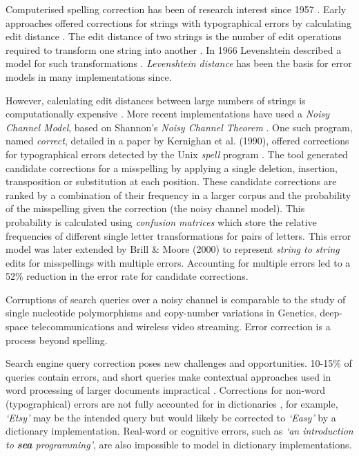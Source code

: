 \documentclass{csfourzero}
\begin{document}
Computerised spelling correction has been of research interest since 1957 \cite{jameslpeterson1980beginning}. Early approaches offered corrections for strings with typographical errors by calculating edit distance \cite{1992correctiondiscussion}. The edit distance of two strings is the number of edit operations required to transform one string into another \cite{introIR}. In 1966 Levenshtein described a model for such transformations \cite{levenshtein1966binary}. \textit{Levenshtein distance} has been the basis for error models in many implementations since.

However, calculating edit distances between large numbers of strings is computationally expensive \cite{2009adaptivespellchecker}. More recent implementations have used a \textit{Noisy Channel Model}, based on Shannon's \textit{Noisy Channel Theorem} \cite{claudeshannon1948}. One such program, named \textit{correct}, detailed in a paper by Kernighan et al. (1990), offered corrections for typographical errors detected by the Unix \textit{spell} program \cite{originalnoisychannel}. The tool generated candidate corrections for a misspelling by applying a single deletion, insertion, transposition or substitution at each position. These candidate corrections are ranked by a combination of their frequency in a larger corpus and the probability of the misspelling given the correction (the noisy channel model). This probability is calculated using \textit{confusion matrices} which store the relative frequencies of different single letter transformations for pairs of letters. This error model was later extended by Brill \& Moore (2000) \cite{betternoisychannel} to represent \textit{string to string} edits for misspellings with multiple errors. Accounting for multiple errors led to a 52\% reduction in the error rate for candidate corrections.

Corruptions of search queries over a noisy channel is comparable to the study of single nucleotide polymorphisms and copy-number variations in Genetics, deep-space telecommunications and wireless video streaming. Error correction is a process beyond spelling.

Search engine query correction poses new challenges and opportunities. 10-15\% of queries contain errors, and short queries make contextual approaches used in word processing of larger documents impractical \cite{webuserpoweredspelling}. Corrections for non-word (typographical) errors are not fully accounted for in dictionaries \cite{webuser3}, for example, \textit{`Etsy'} may be the intended query but would likely be corrected to \textit{`Easy'} by a dictionary implementation. Real-word or cognitive errors, such as \textit{`an introduction to \textbf{sea} programming'}, are also impossible to model in dictionary implementations.
\end{document}
